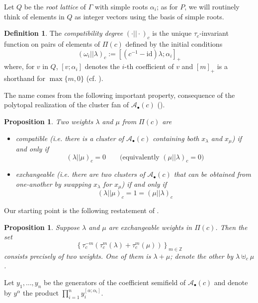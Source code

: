 \documentclass[11pt]{amsart}
\newcommand{\cA}{\mathcal{A}}
\newcommand{\ZZ}{\mathbb{Z}}
\newcommand{\id}{\mathrm{id}}
\newtheorem{proposition}[theorem]{Proposition}
\theoremstyle{definition}
\newtheorem{definition}[theorem]{Definition}
\numberwithin{equation}{section}
\numberwithin{figure}{section}
\begin{document}
  Let $Q$ be the \emph{root lattice} of $\Gamma$ with simple roots $\alpha_i$; as for $P$, we will routinely think of elements in $Q$ as integer vectors using the basis of simple roots.
  \begin{definition}
    The \emph{compatibility degree} $(\cdot||\cdot)_c$ is the unique $\tau_c$-invariant function on pairs of elements of $\Pi(c)$ defined by the initial conditions
    \[
      (\omega_i||\lambda)_c
      :=
      \left[ (c^{-1}-\id)\lambda ; \alpha_i\right]_+
    \]
    where, for $v$ in $Q$, $[v;\alpha_i]$ denotes the $i$-th coefficient of $v$  and $[m]_+$ is a shorthand for $\max\{m, 0\}$ (cf. \cite[Proposition 5.1]{YZ08}).
  \end{definition}
  The name comes from the following important property, consequence of the polytopal realization of the cluster fan of $\cA_\bullet(c)$ (\cite{CFZ02,Ste13}).
  \begin{proposition}
    Two weights $\lambda$ and $\mu$ from $\Pi(c)$ are
    \begin{itemize}
      \item
        \emph{compatible} (i.e. there is a cluster of $\cA_\bullet(c)$ containing both $x_\lambda$ and $x_\mu$) if and only if
        \[
          (\lambda||\mu)_c = 0
          \quad \quad
          \text{(equivalently $(\mu||\lambda)_c=0$)}
        \]

      \item
        \emph{exchangeable} (i.e. there are two clusters of $\cA_\bullet(c)$ that can be obtained from one-another by swapping $x_\lambda$ for $x_\mu$) if and only if
        \[
          (\lambda||\mu)_c = 1 = (\mu||\lambda)_c
        \]
    \end{itemize}
  \end{proposition}

  Our starting point is the following restatement of \cite[Proposition 5.1]{Ste13}. 
  \begin{proposition}
    Suppose $\lambda$ and $\mu$ are exchangeable weights in $\Pi(c)$. 
    Then the set
    \[
      \left\{
        \tau_c^{-m}\left(\tau_c^m(\lambda)+\tau_c^m(\mu)\right)
      \right\}_{m\in\ZZ}
    \]
    consists precisely of two weights. 
    One of them is $\lambda+\mu$; denote the other by $\lambda\uplus_c\mu$.
  \end{proposition}

  Let $y_1,\dots,y_n$ be the generators of the coefficient semifield of $\cA_\bullet(c)$ and denote by $y^\alpha$ the product $\prod_{i=1}^n y_i^{[\alpha;\alpha_i]}$.
\end{document}
